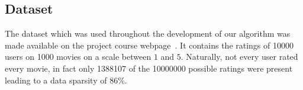 \documentclass[10pt,conference,compsocconf]{IEEEtran}
\begin{document}




\subsection{Dataset}
\label{sub:dataset}

The dataset which was used throughout the development of our algorithm was made
available on the project course webpage~\cite{lab2015collaborative}. It contains
the ratings of \num{10000} users on \num{1000} movies on a scale between $1$ and
$5$. Naturally, not every user rated every movie, in fact only \num{1388107} of
the \num{10000000} possible ratings were present leading to a data sparsity of
$86\%$.
\end{document}
